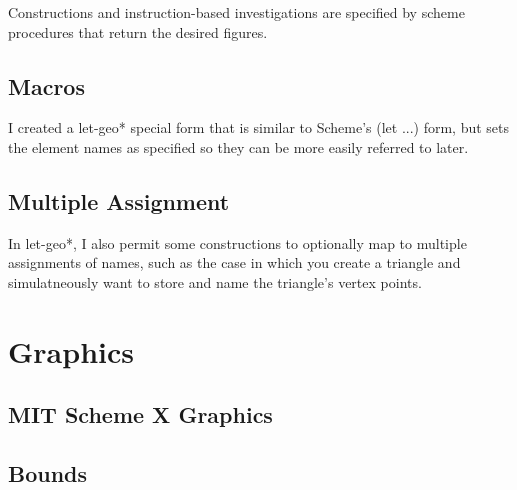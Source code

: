 Constructions and instruction-based investigations are specified by
scheme procedures that return the desired figures.

\subsection{Macros}

I created a let-geo* special form that is similar to Scheme's (let
...) form, but sets the element names as specified so they can be more
easily referred to later.

\subsection{Multiple Assignment}

In let-geo*, I also permit some constructions to optionally map to
multiple assignments of names, such as the case in which you create a
triangle and simulatneously want to store and name the triangle's
vertex points.

\section{Graphics}

\subsection{MIT Scheme X Graphics}

\subsection{Bounds}
